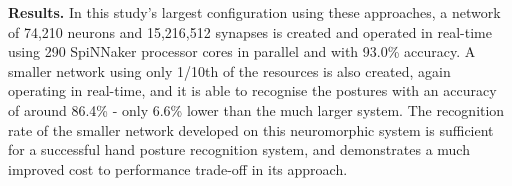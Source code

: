 \documentclass[journal]{journal}
\begin{document}

\textbf{Results.}
In this study's largest configuration using these approaches, a network of 74,210 neurons and 15,216,512 synapses is created and operated in real-time using 290 SpiNNaker processor cores in parallel and with 93.0\% accuracy.
A smaller network using only 1/10th of the resources is also created, again operating in real-time, and it is able to recognise the postures with an accuracy of around 86.4\% - only 6.6\% lower than the much larger system.
The recognition rate of the smaller network developed on this neuromorphic system is sufficient for a successful hand posture recognition system, and demonstrates a much improved cost to performance trade-off in its approach.

\end{document}

